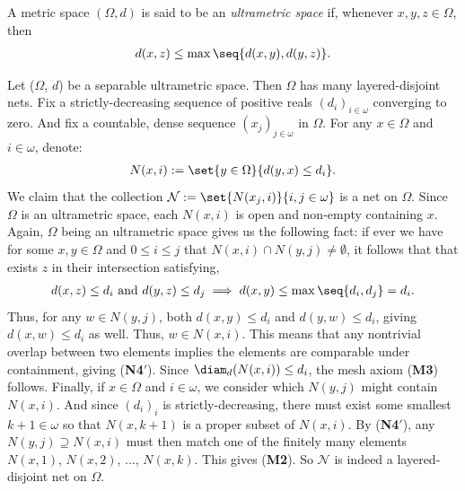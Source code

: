 \begin{definition}
    A metric space $(\Omega, d)$ is said to be an \textit{ultrametric space} if, whenever $x, y, z \in \Omega$, then
    \begin{align*}
        d(x,z) \leq \max \seq{d(x,y), d(y, z)}.
    \end{align*}
\end{definition}

\begin{example}
    \label{example:ultrametric_has_nets}
    Let ($\Omega$, $d$) be a separable ultrametric space. Then $\Omega$ has many layered-disjoint nets. Fix a strictly-decreasing sequence of positive reals $(d_i)_{i \in \omega}$ converging to zero. And fix a countable, dense sequence $(x_j)_{j \in \omega}$ in $\Omega$. For any $x \in \Omega$ and $i \in \omega$, denote:
    \begin{align*}
        N(x, i) := \set{y \in \Omega}{d(y, x) \leq d_i}.
    \end{align*}
    We claim that the collection $\mathcal{N} := \set{N(x_j, i)}{i, j \in \omega}$
    is a net on $\Omega$. Since $\Omega$ is an ultrametric space, each $N(x, i)$ is open and non-empty containing $x$. Again, $\Omega$ being an ultrametric space gives us the following fact: if ever we have for some $x, y \in \Omega$ and $0 \leq i \leq j$ that $N(x, i) \cap N(y, j) \neq \emptyset$, it follows that that exists $z$ in their intersection satisfying,
    \begin{align*}
        d(x, z) \leq d_i \text{ and } d(y, z) \leq d_j \implies d(x, y) \leq \max \seq{d_i, d_j} = d_i.
    \end{align*}
    Thus, for any $w \in N(y, j)$, both $d(x, y) \leq d_i$ and $d(y, w) \leq d_i$, giving $d(x, w) \leq d_i$ as well. Thus, $w \in N(x, i)$. This means that any nontrivial overlap between two elements implies the elements are comparable under containment, giving (\textbf{N4}$'$). Since $\diam_d(N(x, i)) \leq d_i$, the mesh axiom (\textbf{M3}) follows. Finally, if $x \in \Omega$  and $i \in \omega$, we consider which $N(y, j)$ might contain $N(x, i)$. And since $(d_i)_i$ is strictly-decreasing, there must exist some smallest $k + 1 \in \omega$ so that $N(x, k + 1)$ is a proper subset of $N(x, i)$. By (\textbf{N4}$'$), any $N(y, j) \supseteq N(x, i)$ must then match one of the finitely many elements $N(x, 1)$, $N(x, 2)$, ..., $N(x, k)$. This gives (\textbf{M2}). So $\mathcal{N}$ is indeed a layered-disjoint net on $\Omega$. 
\end{example}

